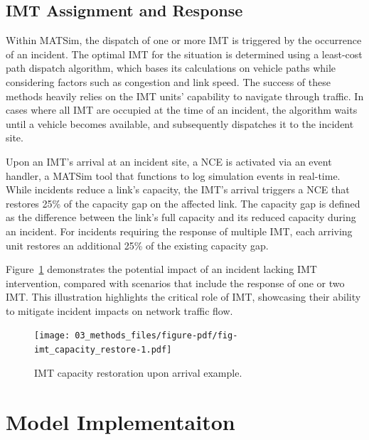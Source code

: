 \documentclass[fancy, oneside, mastersfancy, ms]{byuthesis}
\begin{document}
\hypertarget{sec-imt_response}{%
\subsection{IMT Assignment and Response}\label{sec-imt_response}}

Within MATSim, the dispatch of one or more IMT is triggered by the
occurrence of an incident. The optimal IMT for the situation is
determined using a least-cost path dispatch algorithm, which bases its
calculations on vehicle paths while considering factors such as
congestion and link speed. The success of these methods heavily relies
on the IMT units' capability to navigate through traffic. In cases where
all IMT are occupied at the time of an incident, the algorithm waits
until a vehicle becomes available, and subsequently dispatches it to the
incident site.

Upon an IMT's arrival at an incident site, a NCE is activated via an
event handler, a MATSim tool that functions to log simulation events in
real-time. While incidents reduce a link's capacity, the IMT's arrival
triggers a NCE that restores 25\% of the capacity gap on the affected
link. The capacity gap is defined as the difference between the link's
full capacity and its reduced capacity during an incident. For incidents
requiring the response of multiple IMT, each arriving unit restores an
additional 25\% of the existing capacity gap.

Figure~\ref{fig-imt_capacity_restore} demonstrates the potential impact
of an incident lacking IMT intervention, compared with scenarios that
include the response of one or two IMT. This illustration highlights the
critical role of IMT, showcasing their ability to mitigate incident
impacts on network traffic flow.

\begin{figure}

{\centering \texttt{[image: 03\_methods\_files/figure-pdf/fig-imt\_capacity\_restore-1.pdf]}

}

\caption{\label{fig-imt_capacity_restore}IMT capacity restoration upon
arrival example.}

\end{figure}

\hypertarget{sec-model_imp}{%
\section{Model Implementaiton}\label{sec-model_imp}}
\end{document}
